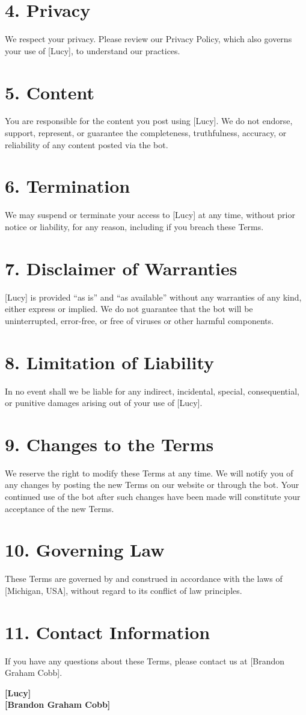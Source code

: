 \documentclass{article}
\begin{document}
\section*{4. Privacy}
We respect your privacy. Please review our Privacy Policy, which also governs your use of [Lucy], to understand our practices.

\section*{5. Content}
You are responsible for the content you post using [Lucy].
We do not endorse, support, represent, or guarantee the completeness, truthfulness, accuracy, or reliability of any content posted via the bot.

\section*{6. Termination}
We may suspend or terminate your access to [Lucy] at any time, without prior notice or liability, for any reason, including if you breach these Terms.

\section*{7. Disclaimer of Warranties}
[Lucy] is provided ``as is'' and ``as available'' without any warranties of any kind, either express or implied.
We do not guarantee that the bot will be uninterrupted, error-free, or free of viruses or other harmful components.

\section*{8. Limitation of Liability}
In no event shall we be liable for any indirect, incidental, special, consequential, or punitive damages arising out of your use of [Lucy].

\section*{9. Changes to the Terms}
We reserve the right to modify these Terms at any time. We will notify you of any changes by posting the new Terms on our website or through the bot.
Your continued use of the bot after such changes have been made will constitute your acceptance of the new Terms.

\section*{10. Governing Law}
These Terms are governed by and construed in accordance with the laws of [Michigan, USA], without regard to its conflict of law principles.

\section*{11. Contact Information}
If you have any questions about these Terms, please contact us at [Brandon Graham Cobb].

\bigskip
\begin{center}
    \textbf{[Lucy]} \\
    \textbf{[Brandon Graham Cobb]}
\end{center}
\end{document}
